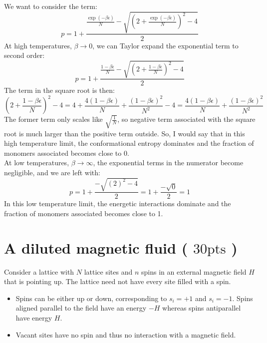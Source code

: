 \documentclass[12pt]{article}
\begin{document}
\subsection{}
We want to consider the term:
\begin{equation}
  p=1+\frac{\frac{\exp (-\beta \epsilon)}{N}-\sqrt{\left(2+\frac{\exp (-\beta \epsilon)}{N}\right)^{2}-4}}{2}
\end{equation}
At high temperatures, $\beta \rightarrow 0$, we can Taylor expand the exponential term to second order:
\begin{equation}
  p=1+\frac{\frac{1-\beta \epsilon}{N}-\sqrt{\left(2+\frac{1-\beta \epsilon}{N}\right)^{2}-4}}{2}
\end{equation}
The term in the square root is then:
\begin{equation}
  \left(2+\frac{1-\beta \epsilon}{N}\right)^{2}-4 = 4 + \frac{4(1-\beta \epsilon)}{N} + \frac{(1-\beta \epsilon)^2}{N^2} - 4 = \frac{4(1-\beta \epsilon)}{N} + \frac{(1-\beta \epsilon)^2}{N^2}
\end{equation}
The former term only scales like $\sqrt{\frac{1}{N}}$, so negative term associated with the square root is much larger than the positive term outside. So, I would say that in this high temperature limit, the conformational entropy dominates and the fraction of monomers associated becomes close to 0.\\
At low temperatures, $\beta \rightarrow \infty$, the exponential terms in the numerator become negligible, and we are left with:
\begin{equation}
  p=1+\frac{-\sqrt{\left(2\right)^{2}-4}}{2} = 1+\frac{-\sqrt{0}}{2} = 1
\end{equation}
In this low temperature limit, the energetic interactions dominate and the fraction of monomers associated becomes close to 1.\\

\section{A diluted magnetic fluid ( $30 \mathrm{pts}$ )}
Consider a lattice with $N$ lattice sites and $n$ spins in an external magnetic field $H$ that is pointing up. The lattice need not have every site filled with a spin.

\begin{itemize}
  \item Spins can be either up or down, corresponding to $s_{i}=+1$ and $s_{i}=-1$. Spins aligned parallel to the field have an energy $-H$ whereas spins antiparallel have energy $H$.
  \item Vacant sites have no spin and thus no interaction with a magnetic field.
\end{itemize}
\end{document}
